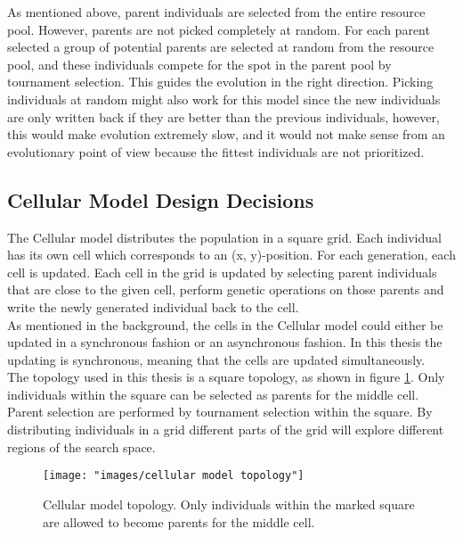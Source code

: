 \noindent As mentioned above, parent individuals are selected from the entire resource pool. However, parents are not picked completely at random. For each parent selected a group of potential parents are selected at random from the resource pool, and these individuals compete for the spot in the parent pool by tournament selection. This guides the evolution in the right direction. Picking individuals at random might also work for this model since the new individuals are only written back if they are better than the previous individuals, however, this would make evolution extremely slow, and it would not make sense from an evolutionary point of view because the fittest individuals are not prioritized.


\subsection{Cellular Model Design Decisions}


\noindent The Cellular model distributes the population in a square grid. Each individual has its own cell which corresponds to an (x, y)-position. For each generation, each cell is updated. Each cell in the grid is updated by selecting parent individuals that are close to the given cell, perform genetic operations on those parents and write the newly generated individual back to the cell.\\


\noindent As mentioned in the background, the cells in the Cellular model could either be updated in a synchronous fashion or an asynchronous fashion. In this thesis the updating is synchronous, meaning that the cells are updated simultaneously.\\


\noindent The topology used in this thesis is a square topology, as shown in figure \ref{figure:cellular model topology}. Only individuals within the square can be selected as parents for the middle cell. Parent selection are performed by tournament selection within the square. By distributing individuals in a grid different parts of the grid will explore different regions of the search space.\\


\begin{figure}
\centering
\texttt{[image: "images/cellular model topology"]}
\caption{Cellular model topology. Only individuals within the marked square are allowed to become parents for the middle cell.}
\label{figure:cellular model topology}
\end{figure}


